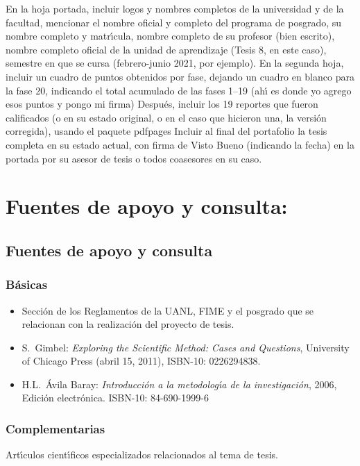 \documentclass[10 pt]{article}
\begin{document}
En la hoja portada, incluir logos y nombres completos de la
universidad y de la facultad, mencionar el nombre oficial y completo
del programa de posgrado, su nombre completo y matr\'{\i}cula, nombre
completo de su profesor (bien escrito), nombre completo oficial de la
unidad de aprendizaje (Tesis 8, en este caso), semestre en que se
cursa (febrero-junio 2021, por ejemplo). En la segunda hoja, incluir
un cuadro de puntos obtenidos por fase, dejando un cuadro en blanco
para la fase 20, indicando el total acumulado de las fases 1--19 (ah\'{\i}
es donde yo agrego esos puntos y pongo mi firma) Despu\'{e}s, incluir los
19 reportes que fueron calificados (o en su estado original, o en el
caso que hicieron una, la versi\'{o}n corregida), usando el paquete
pdfpages Incluir al final del portafolio la tesis completa en su
estado actual, con firma de Visto Bueno (indicando la fecha) en la
portada por su asesor de tesis o todos coasesores en su caso.

\section{Fuentes de apoyo y consulta:}
\subsection{Fuentes de apoyo y consulta}
\subsubsection{B\'{a}sicas}

\begin{itemize}[itemsep=0em]
  
\item{Secci\'{o}n de los Reglamentos de la UANL, FIME y el posgrado
    que se relacionan con la realizaci\'{o}n del proyecto de tesis.}
  
\item{S.\ {\sc Gimbel}: {\em Exploring the Scientific Method: Cases
      and Questions}, University of Chicago Press (abril 15, 2011),
    ISBN-10: 0226294838.}
  
\item{ H.L.\ {\sc \'{A}vila Baray}: {\em Introducci\'{o}n a la
      metodolog\'{\i}a de la investigaci\'{o}n}, 2006, Edici\'{o}n
    electr\'{o}nica. ISBN-10: 84-690-1999-6}
  
\end{itemize}

\subsubsection{Complementarias}

Art\'{\i}culos cient\'{\i}ficos especializados relacionados al tema de tesis.
 
\label{final} %


\end{document}
